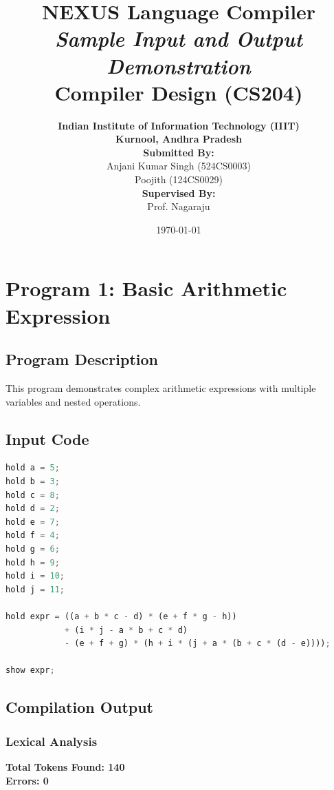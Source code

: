 \documentclass[12pt,a4paper]{report}
\title{\textbf{NEXUS Language Compiler}\\
\vspace{0.5cm}
\textit{Sample Input and Output Demonstration}\\
\vspace{1cm}
\large Compiler Design (CS204)}
\author{
\textbf{Indian Institute of Information Technology (IIIT)}\\
\textbf{Kurnool, Andhra Pradesh}\\
\vspace{1cm}
\textbf{Submitted By:}\\
Anjani Kumar Singh \quad (524CS0003)\\
Poojith \quad (124CS0029)\\
\vspace{1cm}
\textbf{Supervised By:}\\
Prof. Nagaraju
}
\date{\today}
\begin{document}
\maketitle

\tableofcontents
\newpage

\chapter{Program 1: Basic Arithmetic Expression}

\section{Program Description}
This program demonstrates complex arithmetic expressions with multiple variables and nested operations.

\section{Input Code}

\begin{lstlisting}[language=Python, caption={NEXUS Program 1: Complex Arithmetic}]
hold a = 5;
hold b = 3;
hold c = 8;
hold d = 2;
hold e = 7;
hold f = 4;
hold g = 6;
hold h = 9;
hold i = 10;
hold j = 11;

hold expr = ((a + b * c - d) * (e + f * g - h)) 
            + (i * j - a * b + c * d) 
            - (e + f + g) * (h + i * (j + a * (b + c * (d - e))));

show expr;
\end{lstlisting}

\section{Compilation Output}

\subsection{Lexical Analysis}

\textbf{Total Tokens Found: 140}\\
\textbf{Errors: 0}
\end{document}
